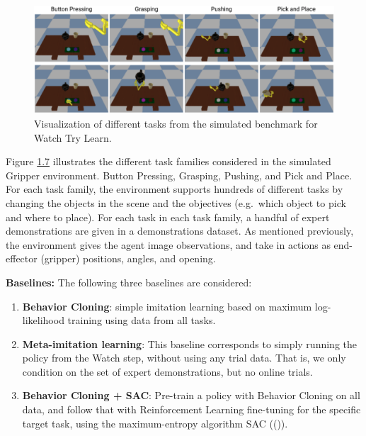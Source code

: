 \documentclass[
  letterpaper,
  DIV=11,
  numbers=noendperiod,
  oneside]{scrreprt}
\theoremstyle{remark}
\begin{document}
\begin{figure}

{\centering \includegraphics{Figures/watch-try-learn-envs.png}

}

\caption{Visualization of different tasks from the simulated benchmark
for Watch Try Learn.}

\end{figure}%

Figure \hyperref[fig:envs]{1.7} illustrates the different task families
considered in the simulated Gripper environment. Button Pressing,
Grasping, Pushing, and Pick and Place. For each task family, the
environment supports hundreds of different tasks by changing the objects
in the scene and the objectives (e.g.~which object to pick and where to
place). For each task in each task family, a handful of expert
demonstrations are given in a demonstrations dataset. As mentioned
previously, the environment gives the agent image observations, and take
in actions as end-effector (gripper) positions, angles, and opening.

\textbf{Baselines:} The following three baselines are considered:

\begin{enumerate}
\def\labelenumi{\arabic{enumi}.}
\item
  \textbf{Behavior Cloning}: simple imitation learning based on maximum
  log-likelihood training using data from all tasks.
\item
  \textbf{Meta-imitation learning}: This baseline corresponds to simply
  running the policy from the Watch step, without using any trial data.
  That is, we only condition on the set of expert demonstrations, but no
  online trials.
\item
  \textbf{Behavior Cloning + SAC}: Pre-train a policy with Behavior
  Cloning on all data, and follow that with Reinforcement Learning
  fine-tuning for the specific target task, using the maximum-entropy
  algorithm SAC (()).
\end{enumerate}
\end{document}
